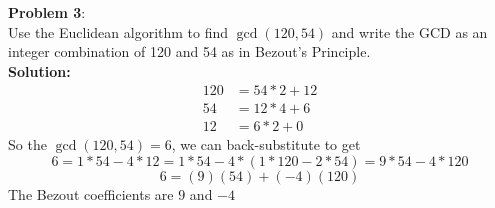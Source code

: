 \documentclass[11pt]{article}
\newcommand{\prob}[3]{\begin{flushleft}
        \textbf{Problem #1}: \\
        #2 
		\textbf{Solution:} 
		#3

\end{flushleft}}
\begin{document}
\prob{3}{
    Use the Euclidean algorithm to find $\gcd(120, 54)$ and write the GCD as an integer combination of 120 and 54 as in Bezout's Principle. \\
}{ \\
    \begin{align*}
        120 & = 54 * 2 + 12 \\
        54  & = 12 * 4 + 6  \\
        12  & = 6 * 2 + 0
    \end{align*}
    So the $\gcd(120,54) = 6$, we can back-substitute to get
    $$6 = 1*54 - 4 * 12 = 1 * 54 - 4 * (1* 120 - 2 * 54) = 9 * 54 - 4 * 120$$
    $$6 = (9)(54) + (-4)(120)$$
    The Bezout coefficients are $9$ and $-4$
}
\end{document}
